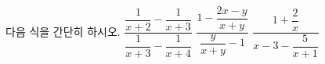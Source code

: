 다음 식을 간단히 하시오.
 $\dfrac{\dfrac{1}{x+2}-\dfrac{1}{x+3}}{\dfrac{1}{x+3}-\dfrac{1}{x+4}}$
 $\dfrac{1-\dfrac{2x-y}{x+y}}{\dfrac{y}{x+y}-1}$
 $\dfrac{1+\dfrac{2}{x}}{x-3-\dfrac{5}{x+1}}$
